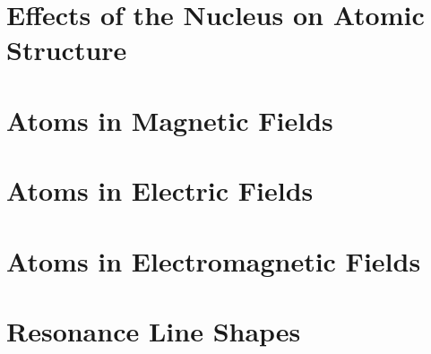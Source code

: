 \documentclass{book}
\theoremstyle{definition}
\begin{document}


\chapter{Effects of the Nucleus on Atomic Structure}














\chapter{Atoms in Magnetic Fields}












\chapter{Atoms in Electric Fields}










\chapter{Atoms in Electromagnetic Fields}














\chapter{Resonance Line Shapes}
\end{document}
